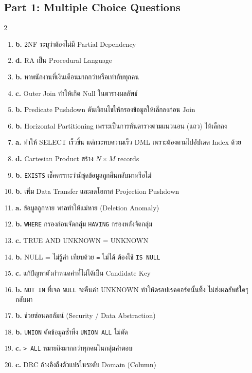 \documentclass[a4paper,12pt]{article}
\begin{document}
\subsection*{Part 1: Multiple Choice Questions}
\begin{multicols}{2}
\begin{enumerate}[label=\textbf{\arabic*.}]
    \setcounter{enumi}{0}
    \item \textbf{b.} 2NF ระบุว่าต้องไม่มี Partial Dependency
    \item \textbf{d.} RA เป็น Procedural Language
    \item \textbf{b.} หาพนักงานที่เงินเดือนมากกว่าหรือเท่ากับทุกคน
    \item \textbf{c.} Outer Join ทำให้เกิด Null ในตารางผลลัพธ์
    \item \textbf{b.} Predicate Pushdown ดันเงื่อนไขให้กรองข้อมูลให้เล็กลงก่อน Join
    \item \textbf{b.} Horizontal Partitioning เพราะเป็นการหั่นตารางตามแนวนอน (แถว) ให้เล็กลง
    \item \textbf{a.} ทำให้ SELECT เร็วขึ้น แต่กระทบความเร็ว DML เพราะต้องตามไปอัปเดต Index ด้วย
    \item \textbf{d.} Cartesian Product สร้าง $N \times M$ records
    \item \textbf{b.} \texttt{EXISTS} เช็คตรรกะว่ามีชุดข้อมูลถูกคืนกลับมาหรือไม่
    \item \textbf{b.} เพิ่ม Data Transfer และลดโอกาส Projection Pushdown
    \item \textbf{a.} ข้อมูลลูกหาย พาลทำให้แม่หาย (Deletion Anomaly)
    \item \textbf{b.} \texttt{WHERE} กรองก่อนจัดกลุ่ม \texttt{HAVING} กรองหลังจัดกลุ่ม
    \item \textbf{c.} TRUE AND UNKNOWN = UNKNOWN
    \item \textbf{b.} NULL = ไม่รู้ค่า เทียบด้วย \texttt{=} ไม่ได้ ต้องใช้ \texttt{IS NULL}
    \item \textbf{c.} แก้ปัญหาตัวกำหนดค่าที่ไม่ได้เป็น Candidate Key
    \item \textbf{b.} \texttt{NOT IN} ที่เจอ \texttt{NULL} จะคืนค่า UNKNOWN ทำให้ดรอปเรคคอร์ดนั้นทิ้ง ไม่ส่งผลลัพธ์ใดๆ กลับมา
    \item \textbf{b.} ช่วยซ่อนคอลัมน์ (Security / Data Abstraction)
    \item \textbf{b.} \texttt{UNION} ตัดข้อมูลซ้ำทิ้ง \texttt{UNION ALL} ไม่ตัด
    \item \textbf{c.} \texttt{> ALL} หมายถึงมากกว่าทุกคนในกลุ่มคำตอบ
    \item \textbf{c.} DRC อ้างอิงถึงตัวแปรในระดับ Domain (Column)
\end{enumerate}
\end{multicols}
\end{document}
